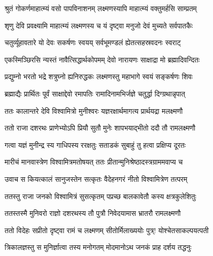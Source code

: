 
\notes{}
\translink{}

\storymeta



\twolineshloka
{श्रुतं गोकर्णमाहात्म्यं वसो पापविनाशनम्}
{लक्ष्मणस्यापि माहात्म्यं वक्तुमर्हसि साम्प्रतम्}%


\twolineshloka
{शृणु देवि प्रवक्ष्यामि माहात्म्यं लक्ष्मणस्य च}
{यं दृष्ट्वा मनुजो देवं मुच्यते सर्वपातकैः}%

\twolineshloka
{चतुर्व्यूहावतारे यो देवः सकर्षणः स्वयय्}
{सर्वभूमण्डलं ह्येतत्सहस्रवदनः स्वराट्}%

\twolineshloka
{एकस्मिञ्छिरसि न्यस्तं नावैत्सिद्धार्थकोपमम्}
{देवो नारायणः साक्षाद्रा मो ब्रह्मादिवन्दितः}%

\twolineshloka
{प्रद्युम्नो भरतो भद्रे शत्रुघ्नो ह्यनिरुद्धकः}
{लक्ष्मणस्तु महाभागे स्वयं सङ्कर्षणः शिवः}%

\twolineshloka
{ब्रह्माद्यैः प्रार्थितः पूर्वं साक्षाद्देवो रमापतिः}
{रामादिनामभिर्जज्ञे चतुर्द्धा दिग्ग्रथान्नृपात्}%

\twolineshloka
{ततः कालान्तरे देवि विश्वामित्रो मुनीश्वरः}
{यज्ञरक्षार्थमागत्य प्रार्थयद्रा मलक्ष्मणौ}%

\twolineshloka
{ततो राजा दशरथः प्राणेभ्योऽपि प्रियौ सुतौ}
{मुनेः शापभयाद्भीतो ददौ तौ रामलक्ष्मणौ}%

\twolineshloka
{गत्वा यज्ञं मुनीन्द्र स्य गाधिपस्य ररक्षतुः}
{सताडकं सुबाहुं तु हत्वा प्रक्षिप्य दूरतः}%

\twolineshloka
{मारीचं मानवास्त्रेण विश्वामित्रमतोषयत्}
{ततः प्रीतान्मुनिश्रेष्ठादस्त्रग्राममवाप्य च}%

\twolineshloka
{उवाच स कियत्कालं सानुजस्तेन सत्कृतः}
{वैदेहनगरं नीतो विश्वामित्रेण तत्परम्}%

\twolineshloka
{ततस्तु राजा जनको विश्वामित्रं सुसत्कृतम्}
{पप्रच्छ बालकावेतौ कस्य क्षत्रकुलेशितुः}%

\twolineshloka
{ततस्तस्मै मुनिवरो राज्ञो दशरथस्य तौ}
{पुत्रौ निवेदयामास भ्रातरौ रामलक्ष्मणौ}%

\twolineshloka
{ततो विदेहः सप्रीतो दृष्ट्वा रामं च लक्ष्मणम्}
{सीतोर्मिलाख्ययोः पुत्र्! योश्चेतसाकल्पयत्पती}%

\twolineshloka
{त्रिकालज्ञस्तु स मुनिर्ज्ञात्वा तस्य मनोगतम्}
{मोदमानोऽथ जनकं प्राह दर्शय तद्धनुः}%

